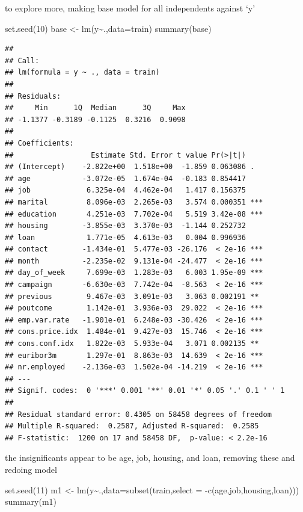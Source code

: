 \documentclass[
]{article}
\newenvironment{Shaded}{\begin{snugshade}}{\end{snugshade}}
\newcommand{\AttributeTok}[1]{\textcolor[rgb]{0.77,0.63,0.00}{#1}}
\newcommand{\DecValTok}[1]{\textcolor[rgb]{0.00,0.00,0.81}{#1}}
\newcommand{\FunctionTok}[1]{\textcolor[rgb]{0.00,0.00,0.00}{#1}}
\newcommand{\NormalTok}[1]{#1}
\newcommand{\OtherTok}[1]{\textcolor[rgb]{0.56,0.35,0.01}{#1}}
\newcommand{\SpecialCharTok}[1]{\textcolor[rgb]{0.00,0.00,0.00}{#1}}
\begin{document}
to explore more, making base model for all independents against `y'

\begin{Shaded}
\begin{Highlighting}[]
\FunctionTok{set.seed}\NormalTok{(}\DecValTok{10}\NormalTok{)}
\NormalTok{base }\OtherTok{\textless{}{-}} \FunctionTok{lm}\NormalTok{(y}\SpecialCharTok{\textasciitilde{}}\NormalTok{.,}\AttributeTok{data=}\NormalTok{train)}
\FunctionTok{summary}\NormalTok{(base)}
\end{Highlighting}
\end{Shaded}

\begin{verbatim}
## 
## Call:
## lm(formula = y ~ ., data = train)
## 
## Residuals:
##     Min      1Q  Median      3Q     Max 
## -1.1377 -0.3189 -0.1125  0.3216  0.9098 
## 
## Coefficients:
##                  Estimate Std. Error t value Pr(>|t|)    
## (Intercept)    -2.822e+00  1.518e+00  -1.859 0.063086 .  
## age            -3.072e-05  1.674e-04  -0.183 0.854417    
## job             6.325e-04  4.462e-04   1.417 0.156375    
## marital         8.096e-03  2.265e-03   3.574 0.000351 ***
## education       4.251e-03  7.702e-04   5.519 3.42e-08 ***
## housing        -3.855e-03  3.370e-03  -1.144 0.252732    
## loan            1.771e-05  4.613e-03   0.004 0.996936    
## contact        -1.434e-01  5.477e-03 -26.176  < 2e-16 ***
## month          -2.235e-02  9.131e-04 -24.477  < 2e-16 ***
## day_of_week     7.699e-03  1.283e-03   6.003 1.95e-09 ***
## campaign       -6.630e-03  7.742e-04  -8.563  < 2e-16 ***
## previous        9.467e-03  3.091e-03   3.063 0.002191 ** 
## poutcome        1.142e-01  3.936e-03  29.022  < 2e-16 ***
## emp.var.rate   -1.901e-01  6.248e-03 -30.426  < 2e-16 ***
## cons.price.idx  1.484e-01  9.427e-03  15.746  < 2e-16 ***
## cons.conf.idx   1.822e-03  5.933e-04   3.071 0.002135 ** 
## euribor3m       1.297e-01  8.863e-03  14.639  < 2e-16 ***
## nr.employed    -2.136e-03  1.502e-04 -14.219  < 2e-16 ***
## ---
## Signif. codes:  0 '***' 0.001 '**' 0.01 '*' 0.05 '.' 0.1 ' ' 1
## 
## Residual standard error: 0.4305 on 58458 degrees of freedom
## Multiple R-squared:  0.2587, Adjusted R-squared:  0.2585 
## F-statistic:  1200 on 17 and 58458 DF,  p-value: < 2.2e-16
\end{verbatim}

the insignificants appear to be age, job, housing, and loan, removing
these and redoing model

\begin{Shaded}
\begin{Highlighting}[]
\FunctionTok{set.seed}\NormalTok{(}\DecValTok{11}\NormalTok{)}
\NormalTok{m1 }\OtherTok{\textless{}{-}} \FunctionTok{lm}\NormalTok{(y}\SpecialCharTok{\textasciitilde{}}\NormalTok{.,}\AttributeTok{data=}\FunctionTok{subset}\NormalTok{(train,}\AttributeTok{select =} \SpecialCharTok{{-}}\FunctionTok{c}\NormalTok{(age,job,housing,loan)))}
\FunctionTok{summary}\NormalTok{(m1)}
\end{Highlighting}
\end{Shaded}
\end{document}
